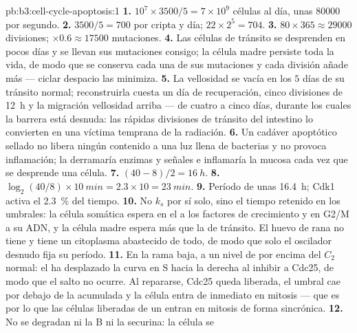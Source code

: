 \begin{solution}{pb:b3:cell-cycle-apoptosis:1}
\textbf{1.} $10^{7}\times 3500/5 = 7\times 10^{9}$ células al día, unas
\num{80000} por segundo.
\textbf{2.} $3500/5 = 700$ por cripta y día; $22\times 2^{5} = 704$.
\textbf{3.} $80\times 365 \approx \num{29000}$ divisiones; $\times 0.6
\approx \num{17500}$ mutaciones.
\textbf{4.} Las células de tránsito se desprenden en pocos días y se
llevan sus mutaciones consigo; la célula madre persiste toda la vida, de
modo que se conserva cada una de sus mutaciones y cada división añade más
--- ciclar despacio las minimiza.
\textbf{5.} La vellosidad se vacía en los $5$ días de su tránsito normal;
reconstruirla cuesta un día de recuperación, cinco divisiones de
\qty{12}{h} y la migración vellosidad arriba --- de cuatro a cinco días,
durante los cuales la barrera está desnuda: las rápidas divisiones de
tránsito del intestino lo convierten en una víctima temprana de la
radiación.
\textbf{6.} Un cadáver apoptótico sellado no libera ningún contenido a
una luz llena de bacterias y no provoca inflamación; la 
derramaría enzimas y señales e inflamaría la mucosa cada vez que se
desprende una célula.
\textbf{7.} $(40 - 8)/2 = \qty{16}{h}$.
\textbf{8.} $\log_{2}(40/8)\times \qty{10}{min} = 2.3\times 10 =
\qty{23}{min}$.
\textbf{9.} Período de unas \qty{16.4}{h}; Cdk1 activa el \qty{2.3}{\%}
del tiempo.
\textbf{10.} No $k_{s}$ por sí solo, sino el tiempo retenido en los
umbrales: la célula somática espera en el  a los
factores de crecimiento y en G2/M a su ADN, y la célula madre espera más
que la de tránsito. El huevo de rana no tiene  y tiene
un citoplasma abastecido de todo, de modo que solo el oscilador desnudo
fija su período.
\textbf{11.} En la rama baja, a un nivel de  por encima del
$C_{2}$ normal: el  ha desplazado la curva en S hacia la
derecha al inhibir a Cdc25, de modo que el salto no ocurre. Al repararse,
Cdc25 queda liberada, el umbral cae por debajo de la  acumulada y
la célula entra de inmediato en mitosis --- que es por lo que las células
liberadas de un  entran en mitosis de forma sincrónica.
\textbf{12.} No se degradan ni la  B ni la securina: la célula se

\end{solution}
